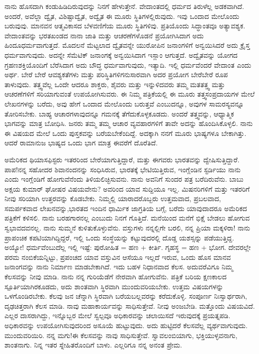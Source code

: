 ನಾನು ಹೊಸದಾಗಿ ಕಂಡುಹಿಡಿದಿರುವುದನ್ನು ನಿನಗೆ ಹೇಳುತ್ತೇನೆ. ವೇದಾಂತದಲ್ಲಿ ಧರ್ಮದ ತಿರುಳೆಲ್ಲ ಅಡಕವಾಗಿದೆ. ಅಂದರೆ, ಅವೆಲ್ಲಾ ದ್ವೈತ, ವಿಶಿಷ್ಟಾದ್ವೈತ, ಅದ್ವೈತ ಈ ಮೂರು ಸ್ಥಿತಿಗಳಲ್ಲಿರುವುದು. ಇವು ಒಂದಾದ ಮೇಲೊಂದು ಬರುವುವು. ಮಾನವನ ಆತ್ಮವಿಕಾಸದ ಬೆಳವಣಿಗೆಯ ಮೂರು ಸ್ಥಿತಿಗಳಿವು. ಪ್ರತಿಯೊಂದು ಸಿದ್ಧಾಂತವೂ ಅತ್ಯಾವಶ್ಯಕ. ವೇದಾಂತವನ್ನು ಭರತಖಂಡದ ನಾನಾ ಜಾತಿ ಮತ್ತು ಆಚರಣೆಗಳೊಡನೆ ಪ್ರಯೋಗಿಸಿದಾಗ ಅದು ಹಿಂದೂಧರ್ಮವಾಗುತ್ತದೆ. ಮೊದಲನೆ ಮೆಟ್ಟಲಾದ ದ್ವೈತವನ್ನೇ ಯುರೋಪಿನ ಜನಾಂಗಳಿಗೆ ಅನ್ವಯಿಸಿದರೆ ಅದು ಕ್ರೈಸ್ತ ಧರ್ಮವಾಗುವುದು. ಅದನ್ನೇ ಸೆಮೆಟಿಕ್ ಜನಾಂಗಕ್ಕೆ ಅನ್ವಯಿಸಿದಾಗ ಇಸ್ಲಾಂ ಆಗುತ್ತದೆ. ಅದ್ವೈತವನ್ನು ಯೋಗದ ಗ್ರಹಣಶಕ್ತಿಯೊಂದಿಗೆ ಬೆರೆಸಿದಾಗ ಅದು ಬೌದ್ಧ ಧರ್ಮವಾಗುವುದು, ಇತ್ಯಾದಿ. ಇಲ್ಲಿ ಧರ್ಮವೆಂದರೆ ವೇದಾಂತ ಎಂದು ಅರ್ಥ. ಬೇರೆ ಬೇರೆ ಆವಶ್ಯಕತೆಗಳು ಮತ್ತು ಪರಿಸ್ಥಿತಿಗಳಿಗನುಸಾರವಾಗಿ ಅದರ ಪ್ರಯೋಗ ಬೇರೆಬೇರೆ ರೂಪ ತಾಳುವುದು. ತತ್ತ್ವವೆಲ್ಲ ಒಂದೇ ಆದರೂ ಶಾಕ್ತರು, ಶೈವರು ಮತ್ತು ಇನ್ನುಳಿದವರು ತಮ್ಮ ಮತತತ್ತ್ವ ಮತ್ತು ಆಚರಣೆಗಳಿಗೆ ಸರಿಯಾಗುವಂತೆ ಉಪಯೋಗಿಸುವರು. ಈ ನಿಮ್ಮ ಪತ್ರಿಕೆಯಲ್ಲಿ ಈ ಮೂರು ತತ್ತ್ವಸಂಪ್ರದಾಯಗಳ ಮೇಲೆ ಲೇಖನಗಳನ್ನು ಬರೆದು, ಅವು ಹೇಗೆ ಒಂದಾದ ಮೇಲೊಂದು ಬರುತ್ತವೆ ಎಂಬುದನ್ನೂ, ಅವುಗಳ ಸಾಮರಸ್ಯವನ್ನೂ ತೋರಿಸಬೇಕು. ಬಾಹ್ಯ ಆಚಾರಗಳಾವುದನ್ನೂ ಗಮನಕ್ಕೆ ತೆಗೆದುಕೊಳ್ಳಕೂಡದು. ಅಂದರೆ ತತ್ತ್ವವನ್ನು, ಆಧ್ಯಾತ್ಮಿಕ ಭಾಗವನ್ನು ಮಾತ್ರ ಬೋಧಿಸಿ. ಜನರು ತಮ್ಮ ತಮ್ಮ ಆಚಾರ ವ್ಯವಹಾರಗಳಿಗೆ ತಾವೇ ಅದನ್ನು ಹೊಂದಿಸಿಕೊಳ್ಳಲಿ. ನಾನು ಈ ವಿಷಯದ ಮೇಲೆ ಒಂದು ಪುಸ್ತಕವನ್ನು ಬರೆಯಬೇಕೆಂದಿದ್ದೆ. ಅದಕ್ಕಾಗಿ ನನಗೆ ಮೂರು ಭಾಷ್ಯಗಳೂ ಬೇಕಾಗಿತ್ತು. ಆದರೆ ರಾಮಾನುಜ ಭಾಷ್ಯದ ಒಂದು ಭಾಗ ಮಾತ್ರ ಈವರೆಗೆ ದೊರೆತಿದೆ.

ಅಮೆರಿಕದ ಥಿಯಾಸಫಿಸ್ಟರು ಇತರರಿಂದ ಬೇರೆಯಾಗುತ್ತಿದ್ದಾರೆ, ಮತ್ತು ಈಗವರು ಭಾರತವನ್ನು ದ್ವೇಷಿಸುತ್ತಿದ್ದಾರೆ. ಪಾಪ!ನನ್ನ ಸಹೋದರ ಶಿವಾನಂದನನ್ನು ಸಂಧಿಸಿರುವ, ಭಾರತಕ್ಕೆ ಭೇಟಿಯಿತ್ತಿರುವ, ಇಂಗ್ಲೆಂಡಿನ ಸ್ಟರ್ಡಿಯು ನಾನು ಎಂದು ಇಂಗ್ಲೆಂಡಿಗೆ ಹೋಗುವೆನೆಂದು ತಿಳಿಯಲಿಚ್ಛಿಸುವನು. ನಾನು ಅವನಿಗೆ ಸುಂದರ ಪತ್ರ ಬರೆದಿರುವೆನು. ಬಾಬು ಅಕ್ಷಯ ಕುಮಾರ್ ಘೋಷರ ವಿಷಯವೇನು? ಅವರಿಂದ ಯಾವ ಸುದ್ದಿಯೂ ಇಲ್ಲ. ಮಿಷನರಿಗಳಿಗೆ ಮತ್ತು ಇತರರಿಗೆ ನೀವು ಸರಿಯಾಗಿ ಉತ್ತರವನ್ನು ಕೊಡಬೇಕು. ನಿಮ್ಮಲ್ಲಿ ಯಾರಾದರೊಬ್ಬರು ಉತ್ತಮವಾದ, ಪ್ರಬಲವಾದ, ಸಮರ್ಪಕವಾದ ಲೇಖನವನ್ನು,\break ಭಾರತದ ಇಂದಿನ ಧಾರ್ಮಿಕ ಜಾಗ್ರತಿಯ ಬಗ್ಗೆ, ಬರೆದು ಯಾವುದಾದರೂ ಅಮೆರಿಕದ ಪತ್ರಿಕೆಗೆ ಕಳಿಸಲಿ. ನಾನು ಬರಹಗಾರನಲ್ಲ ಎಂಬುದು ನಿನಗೆ ಗೊತ್ತಿದೆ. ಮನೆಯಿಂದ ಮನೆಗೆ ಭಿಕ್ಷೆ ಬೇಡಲು ಹೋಗುವ ಸ್ವಭಾವದವನಲ್ಲ. ನಾನು ಸುಮ್ಮನೆ ಕುಳಿತುಕೊಳ್ಳುವೆನು. ವಸ್ತುಗಳು ನನ್ನಲ್ಲಿಗೇ ಬರಲಿ, ನನ್ನ ಪ್ರಿಯಾ ಮಕ್ಕಳಿರಾ! ನಾನು ಪ್ರಾಪಂಚಿಕ ಕಪಟಿಯಾಗಿದ್ದಿದ್ದರೆ, ಇಲ್ಲಿ ಒಂದು ಸಂಸ್ಥೆಯನ್ನು ಕಟ್ಟುವುದರಲ್ಲಿ ದೊಡ್ಡ ಯಶಸ್ಸನ್ನು ಪಡೆಯುತ್ತಿದ್ದ. ಅಯ್ಯೋ! ಧರ್ಮವೆಂಬುದೆಲ್ಲ ಇಲ್ಲಿ ಇಷ್ಟೆ: ಪುರೋಹಿತ = ಹಣ + ಕೀರ್ತಿ. ಗೃಹಸ್ಥ = ಹಣ + ಭೋಗ. ದೇವರಲ್ಲೇ ಪರಮ ನಂಬಿಕೆಯನ್ನಿಟ್ಟು, ಪ್ರಪಂಚದ ಯಾವ ವಸ್ತುವಿನ ಆಸೆಯೂ ಇಲ್ಲದೆ ಇರುವ, ಒಂದು ಹೊಸ ಮಾನವ ಜನಾಂಗವನ್ನು ನಾನು ನಿರ್ಮಾಣ ಮಾಡಬೇಕಾಗಿದೆ. ಇದು ಬಹಳ ನಿಧಾನವಾದ ಕೆಲಸ. ಅದುವರೆವಿಗೂ ನಿಮ್ಮ ಕೆಲಸವನ್ನು ನೀವು ಮಾಡಿ. ನಾನು ನನ್ನ ಗುರಿಯೆಡೆಗೆ ನೇರವಾಗಿ ಹೋಗುವೆನು. ಪತ್ರಿಕೆ ಬರಿಯ ಕ್ಷಣಕಾಲದ ಸ್ಪೂರ್ತಿಯಾಗಿರಕೂಡದು, ಅದು ಶಾಂತವಾಗಿ ಸ್ಥಿರವಾಗಿ ಮುಂದುವರಿಯಬೇಕು. ಉತ್ತಮ ವಿಷಯಗಳನ್ನು ಒಳಗೊಂಡಿರಬೇಕು. ಕೆಲವು ಜನ ಚೆನ್ನಾಗಿ ಸ್ಥಿರವಾಗಿ ಬರೆಯಬಲ್ಲವರನ್ನು ಕರೆದುಕೊಳ್ಳಿ. ಸಂಪೂರ್ಣ ನಿಃಸ್ವಾರ್ಥರಾಗಿ, ದೃಢಚಿತ್ತರಾಗಿ ಕೆಲಸ ಮಾಡಿ. ನಾವು ಮಹಾಕಾರ್ಯವನ್ನು ಸಾಧಿಸುತ್ತೇವೆ. ನೀವು ಅಂಜಬೇಡಿ. ಮತ್ತೊಂದು ವಿಷಯವಿದೆ. ಎಲ್ಲರ ದಾಸರಾಗಿದ್ದು, ಇನ್ನೊಬ್ಬರ ಮೇಲೆ ಸ್ವಲ್ಪವೂ ಅಧಿಕಾರವನ್ನು ಚಲಾಯಿಸದೆ ಇರುವುದಕ್ಕೆ ಪ್ರಯತ್ನಪಡಿ. ಅಧಿಕಾರವನ್ನು ಉಪಯೋಗಿಸುವುದರಿಂದ ಅಸೂಯೆ ಹುಟ್ಟುವುದು. ಅದು ಹುಟ್ಟಿದರೆ ಕೆಲಸವೆಲ್ಲ ವ್ಯರ್ಥವಾಗುವುದು. ಮುಂದುವರಿಯಿರಿ. ನನ್ನ ಮಗು!ಈ ಕೆಲಸವನ್ನು ನಾವು ಸಾಧಿಸುತ್ತೇವೆ. ಸ್ವಾವಲಂಬಿಯಾಗು, ಭಕ್ತಿಯುಳ್ಳವನಾಗು, ಶಾಂತನಾಗು. ನಿನ್ನ ಇತರ ಸ್ನೇಹಿತರೊಂದಿಗೆ ಬಾಳು. ಎಲ್ಲರಿಗೂ ನನ್ನ ಅನಂತ ಪ್ರೇಮ.

